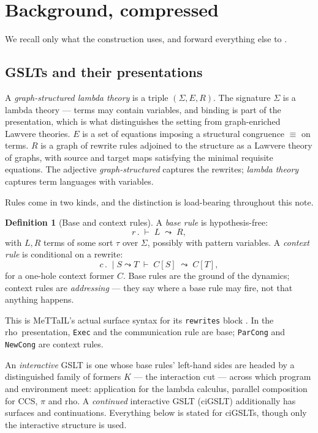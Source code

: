 \documentclass[11pt,a4paper]{article}
\theoremstyle{plain}
\theoremstyle{definition}
\newtheorem{definition}[theorem]{Definition}
\theoremstyle{remark}
\newcommand{\rhoc}{\textsf{rho}}
\begin{document}
\section{Background, compressed}
\label{sec:background}

We recall only what the construction uses, and forward everything else to \cite{omnibus}.

\subsection{GSLTs and their presentations}

A \emph{graph-structured lambda theory} is a triple $(\Sigma, E, R)$. The signature $\Sigma$ is a
lambda theory --- terms may contain variables, and binding is part of the presentation, which is
what distinguishes the setting from graph-enriched Lawvere theories. $E$ is a set of equations
imposing a structural congruence $\equiv$ on terms. $R$ is a graph of rewrite rules adjoined to the
structure as a Lawvere theory of graphs, with source and target maps satisfying the minimal
requisite equations. The adjective \emph{graph-structured} captures the rewrites; \emph{lambda
theory} captures term languages with variables.

Rules come in two kinds, and the distinction is load-bearing throughout this note.

\begin{definition}[Base and context rules]
\label{def:rules}
A \emph{base rule} is hypothesis-free:
\[
r \,.\; \vdash\; L \;\leadsto\; R,
\]
with $L, R$ terms of some sort $\tau$ over $\Sigma$, possibly with pattern variables. A
\emph{context rule} is conditional on a rewrite:
\[
c \,.\; \mid S \leadsto T \;\vdash\; C[S] \;\leadsto\; C[T],
\]
for a one-hole context former $C$. Base rules are the ground of the dynamics; context rules are
\emph{addressing} --- they say where a base rule may fire, not that anything happens.
\end{definition}

This is MeTTaIL's actual surface syntax for its \texttt{rewrites} block \cite{mettail}. In the
\rhoc\ presentation, \texttt{Exec} and the communication rule are base; \texttt{ParCong} and
\texttt{NewCong} are context rules.

An \emph{interactive} GSLT is one whose base rules' left-hand sides are headed by a distinguished
family of formers $K$ --- the interaction cut --- across which program and environment meet:
application for the lambda calculus, parallel composition for CCS, $\pi$ and \rhoc. A
\emph{continued} interactive GSLT (ciGSLT) additionally has surfaces and continuations. Everything
below is stated for ciGSLTs, though only the interactive structure is used.
\end{document}
